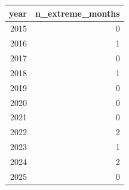 \begin{tabular}{rr}
\toprule
year & n\_extreme\_months \\
\midrule
2015 & 0 \\
2016 & 1 \\
2017 & 0 \\
2018 & 1 \\
2019 & 0 \\
2020 & 0 \\
2021 & 0 \\
2022 & 2 \\
2023 & 1 \\
2024 & 2 \\
2025 & 0 \\
\bottomrule
\end{tabular}
